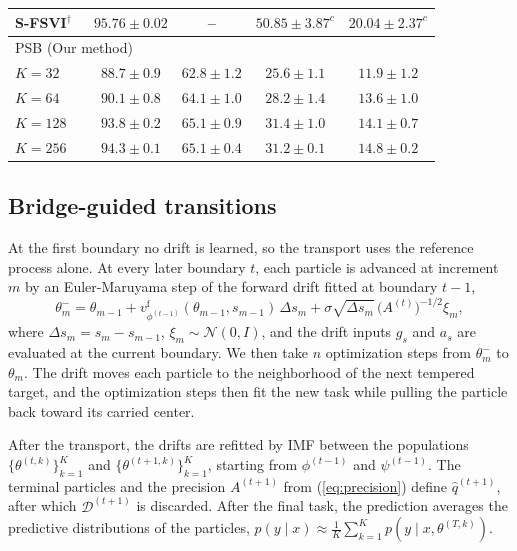 \documentclass{article}
\begin{document}
\begin{table}[t]
\begin{tabular*}{\textwidth}{@{\extracolsep{\fill}}lcccc@{}}
  S-FSVI$^\dagger$~\cite{rudner2022sfsvi,kessler2023sequential}
      & $95.76\pm0.02$ & --
      & $50.85\pm3.87^{c}$ & $20.04\pm2.37^{c}$ \\
  \hline
  \multicolumn{5}{l}{PSB (Our method)} \\
  $K=32$  & $88.7\pm0.9$ & $62.8\pm1.2$
          & $25.6\pm1.1$ & $11.9\pm1.2$ \\
  $K=64$  & $90.1\pm0.8$ & $64.1\pm1.0$
          & $28.2\pm1.4$ & $13.6\pm1.0$ \\
  $K=128$ & $93.8\pm0.2$ & $65.1\pm0.9$
          & $31.4\pm1.0$ & $14.1\pm0.7$ \\
  $K=256$ & $94.3\pm0.1$ & $65.1\pm0.4$
          & $31.2\pm0.1$ & $14.8\pm0.2$ \\
  \hline
  \end{tabular*}
\end{table}
\subsection{Bridge-guided transitions}
\label{sec:transition}

At the first boundary no drift is learned, so the transport uses the
reference process alone. At every later boundary $t$, each particle is advanced
at increment $m$ by an Euler-Maruyama step of the forward drift fitted at
boundary $t-1$,
\begin{equation}
    \theta_m^{-}=\theta_{m-1}
    +v^{\mathrm{f}}_{\phi^{(t-1)}}(\theta_{m-1},s_{m-1})\,\Delta s_m
    +\sigma\sqrt{\Delta s_m}\,\big(A^{(t)}\big)^{-1/2}\xi_m,
    \label{eq:euler}
\end{equation}
where $\Delta s_m=s_m-s_{m-1}$, $\xi_m\sim\mathcal{N}(0,I)$, and the drift
inputs $g_s$ and $a_s$ are evaluated at the current boundary. We then take $n$ optimization steps from $\theta_m^{-}$ to $\theta_m$. The drift moves each particle to the neighborhood of the next tempered target, and the optimization steps then fit the new task while pulling the particle back
toward its carried center.

After the transport, the drifts are refitted by IMF between the populations
$\{\theta^{(t,k)}\}_{k=1}^{K}$ and $\{\theta^{(t+1,k)}\}_{k=1}^{K}$, starting
from $\phi^{(t-1)}$ and $\psi^{(t-1)}$. The terminal particles and the precision
$A^{(t+1)}$ from (\ref{eq:precision}) define $\hat q^{(t+1)}$, after which
$\mathcal{D}^{(t+1)}$ is discarded. After the final task, the prediction
averages the predictive distributions of the particles,
$p(y\mid x)\approx\frac{1}{K}\sum_{k=1}^{K}p(y\mid x,\theta^{(T,k)})$.
\end{document}
